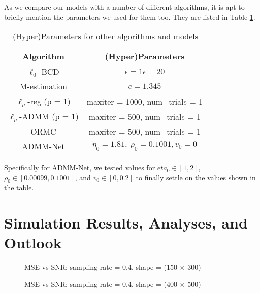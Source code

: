 As we compare our models with a number of different algorithms, it is apt to briefly mention the parameters we used for them too. They are listed in Table \ref{tab:params_net}.

\begin{table}[htbp]
    \centering
    \begin{tabular}{cc}
        \toprule
        \textbf{Algorithm} & \textbf{(Hyper)Parameters} \\
        \midrule
        \(\ell_0\)-BCD & \(\epsilon = 1e-20\) \\
        M-estimation & \(c = 1.345\) \\
        \(\ell_p\)-reg (p = 1) & maxiter = 1000, num\_trials = 1 \\
        \(\ell_p\)-ADMM (p = 1) & maxiter = 500, num\_trials = 1 \\
        ORMC & maxiter = 500, num\_trials = 1 \\
        ADMM-Net & \(\eta_0 = 1.81, \ \rho_0 = 0.1001, v_0 = 0\) \\
        \bottomrule
    \end{tabular}
    \caption{(Hyper)Parameters for other algorithms and models}
    \label{tab:params_net}
\end{table}

Specifically for ADMM-Net, we tested values for \(eta_0 \in [1, 2]\), \(\rho_0 \in [0.00099, 0.1001]\), and \(v_0 \in [0, 0.2]\) to finally settle on the values shown in the table.

\section{Simulation Results, Analyses, and Outlook}
\begin{figure}[htbp]
    \centering
    
    \caption{MSE vs SNR: sampling rate = 0.4, shape = (150 \(\times\) 300)}
    \label{fig:mse_snr_150_300}
\end{figure}

\begin{figure}[htbp]
    \centering
    
    \caption{MSE vs SNR: sampling rate = 0.4, shape = (400 \(\times\) 500)}
    \label{fig:mse_snr_400_500}
\end{figure}

